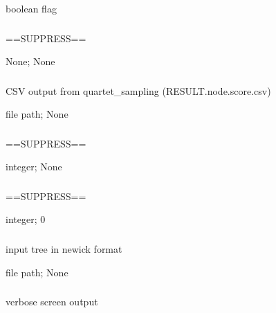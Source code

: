 \documentclass[letterpaper,12pt,english]{sphinxmanual}
\begin{document}
 boolean flag


\subsubsection{}
\label{\detokenize{prog_desc:id10}}
 ==SUPPRESS==

 None;  None


\subsubsection{}
\label{\detokenize{prog_desc:d-data}}
 CSV output from quartet\_sampling (RESULT.node.score.csv)

 file path;  None


\subsubsection{}
\label{\detokenize{prog_desc:id11}}
 ==SUPPRESS==

 integer;  None


\subsubsection{}
\label{\detokenize{prog_desc:id12}}
 ==SUPPRESS==

 integer;  0


\subsubsection{}
\label{\detokenize{prog_desc:t-tree}}
 input tree in newick format

 file path;  None


\subsubsection{}
\label{\detokenize{prog_desc:id13}}
 verbose screen output
\end{document}
